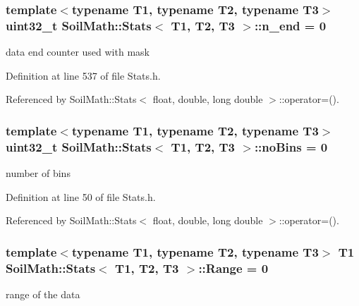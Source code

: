 \hypertarget{class_soil_math_1_1_stats_a58553c8379f35dbc40f46ad228b5457e}{}
\subsubsection[{n\+\_\+end}]{\setlength{\rightskip}{0pt plus 5cm}template$<$typename T1, typename T2, typename T3$>$ uint32\+\_\+t {\bf Soil\+Math\+::\+Stats}$<$ T1, T2, T3 $>$\+::n\+\_\+end = 0\hspace{0.3cm}{\ttfamily [private]}}\label{class_soil_math_1_1_stats_a58553c8379f35dbc40f46ad228b5457e}
data end counter used with mask 

Definition at line 537 of file Stats.\+h.



Referenced by Soil\+Math\+::\+Stats$<$ float, double, long double $>$\+::operator=().

\hypertarget{class_soil_math_1_1_stats_a4202c9085eacaff2e04eda84fc90e92b}{}
\subsubsection[{no\+Bins}]{\setlength{\rightskip}{0pt plus 5cm}template$<$typename T1, typename T2, typename T3$>$ uint32\+\_\+t {\bf Soil\+Math\+::\+Stats}$<$ T1, T2, T3 $>$\+::no\+Bins = 0}\label{class_soil_math_1_1_stats_a4202c9085eacaff2e04eda84fc90e92b}
number of bins 

Definition at line 50 of file Stats.\+h.



Referenced by Soil\+Math\+::\+Stats$<$ float, double, long double $>$\+::operator=().

\hypertarget{class_soil_math_1_1_stats_a7154ac6c97dc2e83bdff7fef3cbdac5b}{}
\subsubsection[{Range}]{\setlength{\rightskip}{0pt plus 5cm}template$<$typename T1, typename T2, typename T3$>$ T1 {\bf Soil\+Math\+::\+Stats}$<$ T1, T2, T3 $>$\+::Range = 0}\label{class_soil_math_1_1_stats_a7154ac6c97dc2e83bdff7fef3cbdac5b}
range of the data 

